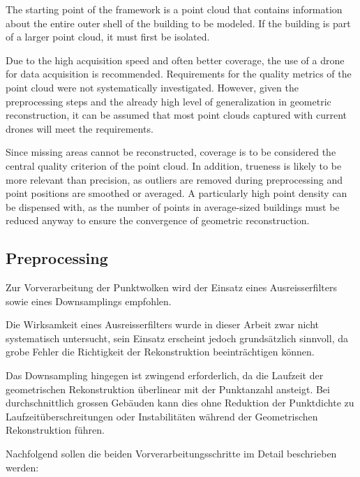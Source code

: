 \begin{English}
The starting point of the framework is a point cloud that contains information about the entire outer shell of the building to be modeled. If the building is part of a larger point cloud, it must first be isolated.

Due to the high acquisition speed and often better coverage, the use of a drone for data acquisition is recommended. Requirements for the quality metrics of the point cloud were not systematically investigated. However, given the preprocessing steps and the already high level of generalization in geometric reconstruction, it can be assumed that most point clouds captured with current drones will meet the requirements.

Since missing areas cannot be reconstructed, coverage is to be considered the central quality criterion of the point cloud. In addition, trueness is likely to be more relevant than precision, as outliers are removed during preprocessing and point positions are smoothed or averaged. A particularly high point density can be dispensed with, as the number of points in average-sized buildings must be reduced anyway to ensure the convergence of geometric reconstruction.
\end{English}

\subsection{Preprocessing}
\begin{German}
Zur Vorverarbeitung der Punktwolken wird der Einsatz eines Ausreisserfilters sowie eines Downsamplings empfohlen.

Die Wirksamkeit eines Ausreisserfilters wurde in dieser Arbeit zwar nicht systematisch untersucht, sein Einsatz erscheint jedoch grundsätzlich sinnvoll, da grobe Fehler die Richtigkeit der Rekonstruktion beeinträchtigen können.

Das Downsampling hingegen ist zwingend erforderlich, da die Laufzeit der geometrischen Rekonstruktion überlinear mit der Punktanzahl ansteigt. Bei durchschnittlich grossen Gebäuden kann dies ohne Reduktion der Punktdichte zu Laufzeitüberschreitungen oder Instabilitäten während der Geometrischen Rekonstruktion führen.

Nachfolgend sollen die beiden Vorverarbeitungsschritte im Detail beschrieben werden:\\
\end{German}

